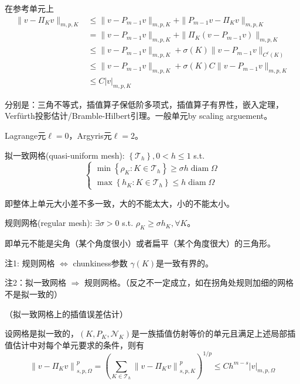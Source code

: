 \begin{pf}
  在参考单元上
  \[
    \begin{aligned}
      \|v - \Pi_K v\|_{m, p, K} &\le \|v - P_{m - 1} v\|_{m, p, K} + \|P_{m - 1} v - \Pi_K v\|_{m, p, K}\\
      &= \|v - P_{m - 1} v\|_{m, p, K} + \|\Pi_K(v - P_{m - 1} v)\|_{m, p, K}\\
      &\le \|v - P_{m - 1} v\|_{m, p, K} + \sigma(K)\|v - P_{m - 1} v\|_{C^\ell(K)}\\
      &\le \|v - P_{m - 1} v\|_{m, p, K} + \sigma(K)C\|v - P_{m - 1} v\|_{m, p, K}\\
      &\le C |v|_{m, p, K}
    \end{aligned}
  \]

  分别是：三角不等式，插值算子保低阶多项式，插值算子有界性，嵌入定理，Verfürth投影估计/Bramble-Hilbert引理。一般单元by scaling arguement。
\end{pf}

Lagrange元$\ell = 0$，Argyris元$\ell = 2$。

拟一致网格(quasi-uniform mesh): $\left\{\mathcal{T}_{h}\right\}, 0<h \le 1$ s.t.
\[
  \left\{\begin{array}{l}
    \min \left\{\rho_{K}: K \in \mathcal{T}_{h}\right\} \geq \sigma h \operatorname{diam} \Omega \\
    \max \left\{h_{K}: K \in \mathcal{T}_{h}\right\} \le h \operatorname{diam} \Omega
  \end{array}\right.
\]

即整体上单元大小差不多一致，大的不能太大，小的不能太小。

规则网格(regular mesh): $\exists \sigma>0$ s.t. $\rho_{K} \geq \sigma h_{K}, \forall K$。

即单元不能是尖角（某个角度很小）或者扁平（某个角度很大）的三角形。

注1: 规则网格 $\Leftrightarrow$ chunkiness参数  $\gamma(K)$是一致有界的。

注2：拟一致网格 $\Rightarrow$ 规则网格。（反之不一定成立，如在拐角处规则加细的网格不是拟一致的）

\begin{thm}（拟一致网格上的插值误差估计）
  
  设网格是拟一致的，$\left(K, P_{K}, \mathcal{N}_{K}\right)$是一族插值仿射等价的单元且满足上述局部插值估计中对每个单元要求的条件，则有
  \[
    \left\|v-\Pi_{K} v\right\|_{s, p, \Omega}^p = \left(\sum_{K \in \mathcal{T}_{h}}\left\|v-\Pi_{K} v\right\|_{s, p, K}^{p}\right)^{1 / p} \le C h^{m-s}|v|_{m, p, \Omega}
  \]
\end{thm}

